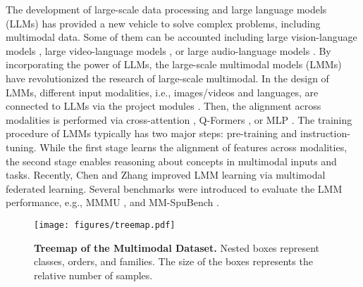 The development of large-scale data processing and large language models (LLMs) has provided a new vehicle to solve complex problems, including multimodal data. Some of them can be accounted including large vision-language models \cite{liu2024improved, liu2024visual}, large video-language models \cite{weng2024longvlm, zhao2023learning}, or large audio-language models \cite{hussain2023m, ghosal2023text}.
By incorporating the power of LLMs, the large-scale multimodal models (LMMs) have revolutionized the research of large-scale multimodal.
In the design of LMMs, different input modalities, i.e., images/videos and languages, are connected to LLMs via the project modules \cite{liu2024visual}. Then, the alignment across modalities is performed via cross-attention \cite{liu2024improved}, Q-Formers \cite{li2023blip}, or MLP \cite{liu2024visual}.
The training procedure of LMMs typically has two major steps: pre-training and instruction-tuning.
While the first stage learns the alignment of features across modalities, the second stage enables reasoning about concepts in multimodal inputs and tasks.
Recently, Chen and Zhang \cite{chenfedmbridge} improved LMM learning via multimodal federated learning.
Several benchmarks were introduced to evaluate the LMM performance, e.g., MMMU \cite{yue2024mmmu}, and
MM-SpuBench \cite{ye2024mm}.



\begin{figure*}[!t]
\begin{center}
\texttt{[image: figures/treemap.pdf]}
\end{center}
\caption{\textbf{Treemap of the Multimodal Dataset.} Nested boxes represent classes, orders, and families. The size of the boxes represents the relative number of samples.}
\label{fig:treemap}
\vspace{-5mm}
\end{figure*}